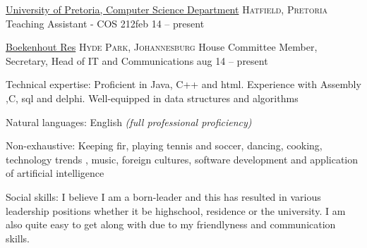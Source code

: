 \headedsection  %
  {\href{http://www.cs.up.ac.za}{University of Pretoria, Computer Science Department}}
  {\textsc{Hatfield, Pretoria}} {%
  \headedsubsection
    {Teaching Assistant - COS 212}{feb 14 --  present}
    {}
    }
    
\headedsection  %
  {\href{http://www.up.ac.za/boekenhout}{Boekenhout Res}}
  {\textsc{Hyde Park, Johannesburg}} {%
  \headedsubsection
    {House Committee Member, Secretary, Head of IT and Communications   }
    {aug 14 – present}
    {}
}
    
\spacedhrule{-0.2em}{-0.4em}



\inlineheadsection  %
  {Technical expertise:}
  {Proficient in Java, C++ and html. Experience with Assembly ,C, sql and delphi. Well-equipped in data structures and algorithms}

\vspace{0.5em}
\inlineheadsection
  {Natural languages:}
  {English \emph{(full professional proficiency)}}


\spacedhrule{1.6em}{-0.4em}

\inlineheadsection
  {Non-exhaustive:}
  {Keeping fir, playing tennis and soccer, dancing, cooking, technology trends , music, foreign cultures, software development and application of artificial intelligence}

  
\spacedhrule{1.6em}{-0.4em}  
  

\inlineheadsection
  {Social skills:}
  {I believe I am a born-leader and this has resulted in various leadership positions whether it be highschool, residence or the university. I am also quite easy to get along with due to my friendlyness and communication skills.}
  
